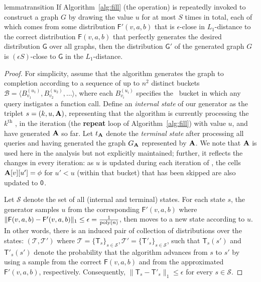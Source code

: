 \begin{restatable}{lemma}{transition}\label{lemma:transition}
If Algorithm~\ref{alg:fill} (the  operation) is repeatedly invoked to construct a graph $G$ by drawing the value $u$ for at most $S$ times in total, each of which comes from some distribution $\mathsf{F}'(v,a,b)$ that is $\epsilon$-close in $L_1$-distance to the correct distribution $\mathsf{F}(v,a,b)$ that perfectly generates the desired distribution $\mathsf{G}$ over all graphs, then the distribution $\mathsf{G}'$ of the generated graph $G$ is $(\epsilon S)$-close to $\mathsf{G}$ in the $L_1$-distance.
\end{restatable}
\begin{proof}
\label{proof:transition}
For simplicity, assume that the algorithm generates the graph to completion according to a sequence of up to $n^2$ distinct buckets $\mathcal{B} = \langle B^{(u_1)}_{v_1}, B^{(u_2)}_{v_2}, \ldots \rangle$, where each $B^{(u_i)}_{v_i}$ specifies the \unfilled~bucket in which any query instigates a  function call. Define an \emph{internal state} of our generator as the triplet $s = (k, u, \mathbf{A})$, representing that the algorithm is currently processing the $k^\textrm{th}$ , in the iteration (the \textbf{repeat} loop of Algorithm~\ref{alg:fill}) with value $u$, and have generated $\mathbf{A}$ so far. Let $t_{\mathbf{A}}$ denote the \emph{terminal state} after processing all queries and having generated the graph $G_{\mathbf{A}}$ represented by $\mathbf{A}$. We note that $\mathbf{A}$ is used here in the analysis but not explicitly maintained; further, it reflects the changes in every iteration: as $u$ is updated during each iteration of , the cells $\mathbf{A}[v][u'] = \phi$ for $u' < u$ (within that bucket) that has been skipped are also updated to $\mathsf{0}$.

Let $\mathcal{S}$ denote the set of all (internal and terminal) states. For each state $s$, the generator samples $u$ from the corresponding $\mathsf{F}'(v,a,b)$ where $\|\mathsf{F}(v,a,b)-\mathsf{F}'(v,a,b)\|_1 \leq \epsilon = \frac{1}{\mathrm{poly}(n)}$, then moves to a new state according to $u$. In other words, there is an induced pair of collection of distributions over the states: $(\mathcal{T},\mathcal{T}')$ where $\mathcal{T}=\{\mathsf{T}_s\}_{s\in\mathcal{S}}, \mathcal{T}'=\{\mathsf{T}'_s\}_{s\in\mathcal{S}}$, such that $\mathsf{T}_s(s')$ and $\mathsf{T}'_s(s')$ denote the probability that the algorithm advances from $s$ to $s'$ by using a sample from the correct $\mathsf{F}(v,a,b)$ and from the approximated $\mathsf{F}'(v,a,b)$, respectively. Consequently, $\|\mathsf{T}_s-\mathsf{T}'_s\|_1 \leq \epsilon$ for every $s\in\mathcal{S}$.


\end{proof}

